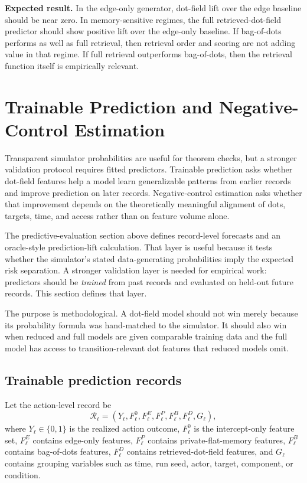 \documentclass[11pt]{article}
\theoremstyle{remark}
\begin{document}
\textbf{Expected result.} In the edge-only generator, dot-field lift over the
edge baseline should be near zero. In memory-sensitive regimes, the full
retrieved-dot-field predictor should show positive lift over the edge-only
baseline. If bag-of-dots performs as well as full retrieval, then retrieval order
and scoring are not adding value in that regime. If full retrieval outperforms
bag-of-dots, then the retrieval function itself is empirically relevant.

\section{Trainable Prediction and Negative-Control Estimation}\label{trainable-prediction-negative-control-estimation}

Transparent simulator probabilities are useful for theorem checks, but a stronger validation protocol requires fitted predictors. Trainable prediction asks whether dot-field features help a model learn generalizable patterns from earlier records and improve prediction on later records. Negative-control estimation asks whether that improvement depends on the theoretically meaningful alignment of dots, targets, time, and access rather than on feature volume alone.


The predictive-evaluation section above defines record-level forecasts and an
oracle-style prediction-lift calculation. That layer is useful because it tests
whether the simulator's stated data-generating probabilities imply the expected
risk separation. A stronger validation layer is needed for empirical work:
predictors should be \emph{trained} from past records and evaluated on held-out
future records. This section defines that layer.

The purpose is methodological. A dot-field model should not win merely because
its probability formula was hand-matched to the simulator. It should also win
when reduced and full models are given comparable training data and the full
model has access to transition-relevant dot features that reduced models omit.

\subsection{Trainable prediction records}\label{trainable-prediction-records}

Let the action-level record be
\[
\mathcal R_\ell=(Y_\ell,F^0_\ell,F^E_\ell,F^P_\ell,F^B_\ell,F^D_\ell,G_\ell),
\]
where $Y_\ell\in\{0,1\}$ is the realized action outcome, $F^0_\ell$ is the
intercept-only feature set, $F^E_\ell$ contains edge-only features, $F^P_\ell$
contains private-flat-memory features, $F^B_\ell$ contains bag-of-dots features,
$F^D_\ell$ contains retrieved-dot-field features, and $G_\ell$ contains grouping
variables such as time, run seed, actor, target, component, or condition.
\end{document}
